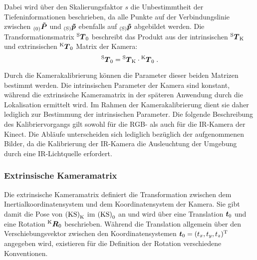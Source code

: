 
Dabei wird über den Skalierungsfaktor $s$ die Unbestimmtheit der Tiefeninformationen beschrieben, da alle Punkte auf der Verbindungslinie zwischen ${_{{\mathrm{(0)}}}}\mbox{\boldmath{$\tilde{P}$}}$ und ${_{{\mathrm{(S)}}}}\mbox{\boldmath{$\tilde{p}$}}$ ebenfalls auf ${_{{\mathrm{(S)}}}}\mbox{\boldmath{$\tilde{p}$}}$ abgebildet werden. Die Transformationsmatrix ${^{\mathrm{S}}\mbox{\boldmath{$T$}}_{\mathrm{0}}}$ beschreibt das Produkt aus der intrinsischen ${^{\mathrm{S}}\mbox{\boldmath{$T$}}_{\mathrm{K}}}$ und extrinsischen ${^{\mathrm{K}}\mbox{\boldmath{$T$}}_{\mathrm{0}}}$ Matrix der Kamera:
%
\begin{equation}
{^{\mathrm{S}}\mbox{\boldmath{$T$}}_{\mathrm{0}}} = {^{\mathrm{S}}\mbox{\boldmath{$T$}}_{\mathrm{K}}} \cdot {^{\mathrm{K}}\mbox{\boldmath{$T$}}_{\mathrm{0}}} \; \text{.}
\end{equation}

Durch die Kamerakalibrierung können die Parameter dieser beiden Matrizen bestimmt werden. Die intrinsischen Parameter der Kamera sind konstant, während die extrinsische Kameramatrix in der späteren Anwendung durch die Lokalisation ermittelt wird. Im Rahmen der Kamerakalibrierung dient sie daher lediglich zur Bestimmung der intrinsischen Parameter. Die folgende Beschreibung des Kalibriervorgangs gilt sowohl für die RGB- als auch für die IR-Kamera der Kinect. Die Abläufe unterscheiden sich lediglich bezüglich der aufgenommenen Bilder, da die Kalibrierung der IR-Kamera die Ausleuchtung der Umgebung durch eine IR-Lichtquelle erfordert.

\subsubsection{Extrinsische Kameramatrix}
\label{chap.perspproj}
\prever{
}
Die extrinsische Kameramatrix definiert die Transformation zwischen dem Inertialkoordinatensystem und dem Koordinatensystem der Kamera. Sie gibt damit die Pose von ${\mathrm{(KS)}}_{\mathrm{K}}$ im ${\mathrm{(KS)}}_{\mathrm{0}}$ an und wird über eine Translation $\mbox{\boldmath{$t$}}_{\mathrm{0}}$ und eine Rotation ${^{\mathrm{K}}\mbox{\boldmath{$R$}}_{\mathrm{0}}}$ beschrieben. Während die Translation allgemein über den Verschiebungsvektor zwischen den Koordinatensystemen $\mbox{\boldmath{$t$}}_{\mathrm{0}} = (t_x, t_y, t_z)^{\mathrm{T}}$ angegeben wird, existieren für die Definition der Rotation verschiedene Konventionen.\\

\prever{
}



